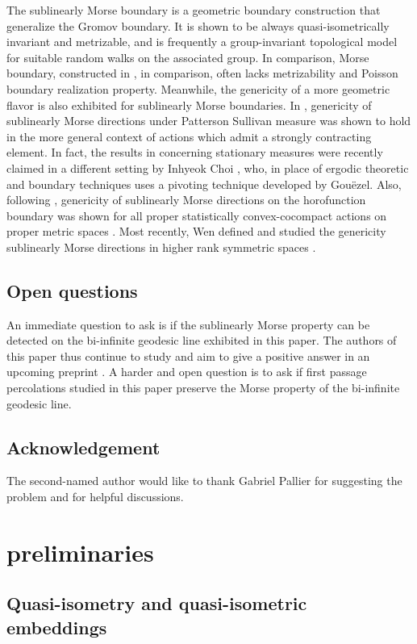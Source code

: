 \documentclass[12 pt]{amsart}
\theoremstyle{definition}
\theoremstyle{remark}
\begin{document}
The sublinearly Morse boundary is a  geometric boundary construction that generalize the Gromov boundary. It is shown to be always quasi-isometrically invariant and  metrizable, and is frequently a group-invariant topological model for suitable random walks on the associated group. In comparison, Morse boundary, constructed in \cite{Morse, contracting}, in comparison, often lacks metrizability and Poisson boundary realization property.   Meanwhile, the genericity of a more geometric flavor is also exhibited for sublinearly Morse boundaries. In \cite{GQR22}, genericity of sublinearly Morse directions under Patterson Sullivan measure was shown to hold in the more general context of actions which admit a strongly contracting element. In fact, the results in \cite{GQR22} concerning stationary measures were recently claimed in a different setting by Inhyeok Choi \cite{Choi}, who, in place of ergodic theoretic and boundary techniques uses a pivoting technique developed by Gou\"ezel\cite{Gou22}. Also, following  \cite{wenyuan}, genericity of sublinearly Morse directions on the horofunction boundary was shown for all proper statistically convex-cocompact actions on proper metric spaces \cite{QY24}. Most recently, Wen defined and studied the genericity sublinearly Morse directions in higher rank symmetric spaces \cite{rouwen25}.

\subsection*{Open questions}
An immediate question to ask is if the sublinearly Morse property can be detected on the bi-infinite geodesic line exhibited in this paper. The authors of this paper thus continue to study and aim to give a positive answer in an upcoming preprint \cite{JQ25b}. A harder and open question is to ask if first passage percolations studied in this paper preserve the Morse property of the bi-infinite geodesic line. 
\subsection*{Acknowledgement} The second-named author would like to thank Gabriel Pallier for suggesting the problem and for helpful discussions.


\section{preliminaries}

\subsection{Quasi-isometry and quasi-isometric embeddings}
\end{document}
